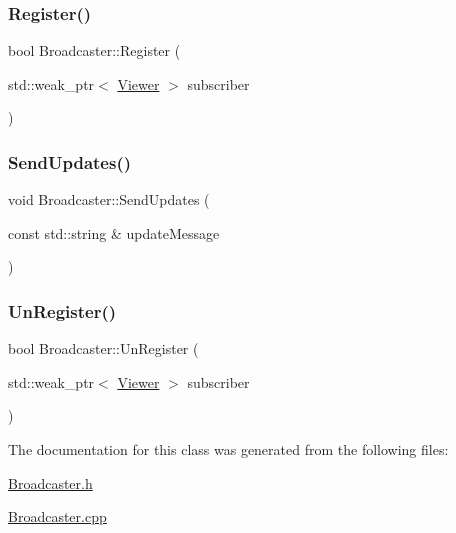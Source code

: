 \subsubsection{\texorpdfstring{Register()}{Register()}}
{\footnotesize\ttfamily bool Broadcaster\+::\+Register (\begin{DoxyParamCaption}\item[{std\+::weak\+\_\+ptr$<$ \mbox{\hyperlink{class_viewer}{Viewer}} $>$}]{subscriber }\end{DoxyParamCaption})}

\mbox{\label{class_broadcaster_a3be261b528ffd56850ae45f1edc92596}} 
\subsubsection{\texorpdfstring{SendUpdates()}{SendUpdates()}}
{\footnotesize\ttfamily void Broadcaster\+::\+Send\+Updates (\begin{DoxyParamCaption}\item[{const std\+::string \&}]{update\+Message }\end{DoxyParamCaption})}

\mbox{\label{class_broadcaster_ab3ab62a97391f6dfebce031e7b6f39ac}} 
\subsubsection{\texorpdfstring{UnRegister()}{UnRegister()}}
{\footnotesize\ttfamily bool Broadcaster\+::\+Un\+Register (\begin{DoxyParamCaption}\item[{std\+::weak\+\_\+ptr$<$ \mbox{\hyperlink{class_viewer}{Viewer}} $>$}]{subscriber }\end{DoxyParamCaption})}



The documentation for this class was generated from the following files\+:\begin{DoxyCompactItemize}
\item 
\mbox{\hyperlink{_broadcaster_8h}{Broadcaster.\+h}}\item 
\mbox{\hyperlink{_broadcaster_8cpp}{Broadcaster.\+cpp}}\end{DoxyCompactItemize}
